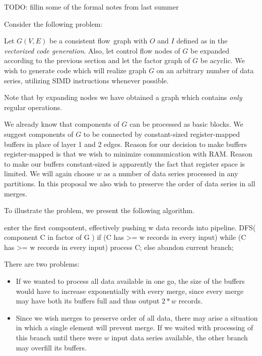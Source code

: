TODO: fillin some of the formal notes from last summer

Consider the following problem:

\begin{problem}
Let $G(V,E)$ be a consistent flow~graph with $O$ and $I$ defined as in the \emph{vectorized code generation}. Also, let control flow nodes of $G$ be expanded according to the previous section and let the factor graph of $G$ be acyclic. We wish to generate code which will realize graph $G$ on an arbitrary number of data series, utilizing SIMD instructions whenever possible. 
\end{problem}

\begin{rem} 
Note that by expanding nodes we have obtained a graph which contains \emph{only} regular operations.
\end{rem}

We already know that components of $G$ can be processed as basic blocks. We suggest components of $G$ to be connected by constant-sized register-mapped buffers in place of layer 1 and 2 edges. Reason for our decision to make buffers register-mapped is that we wish to minimize communication with RAM. Reason to make our buffers constant-sized is apparently the fact that register space is limited. We will again choose $w$ as a number of data series processed in any partitions. In this proposal we also wish to preserve the order of data series in all merges.

\parspace

To illustrate the problem, we present the following algorithm.

\begin{code}
enter the first compontent, 
  effectively pushing w data records into pipeline.
DFS( component C in factor of G )
{
  if (C has >= w records in every input)
    while (C has >= w records in every input)
      process C;
  else
    abandon current branch;
}
\end{code}

There are two problems:

\begin{itemize}
  \item If we wanted to process all data available in one go, the size of the buffers would have to increase exponentially with every merge, since every merge may have both its buffers full and thus output $2*w$ records.
  \item Since we wish merges to preserve order of all data, there may arise a situation in which a single element will prevent merge. If we waited with processing of this branch until there were $w$ input data series available, the other branch may overfill its buffers.
\end{itemize}

